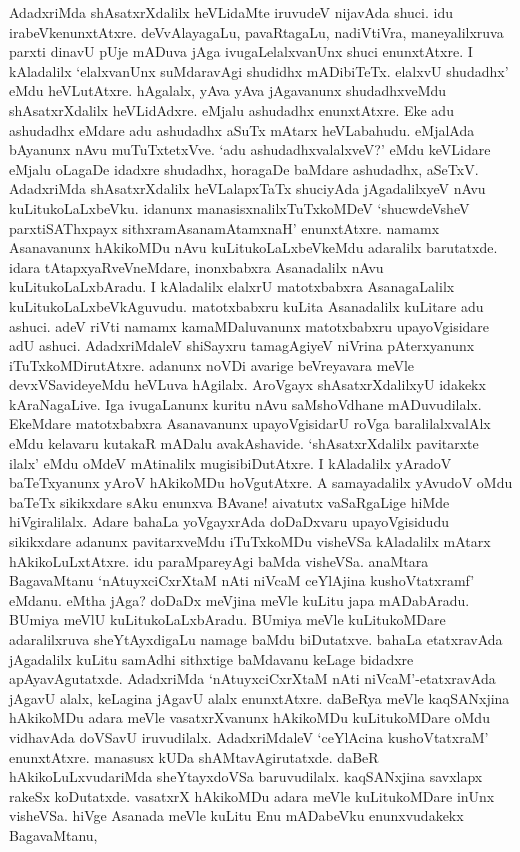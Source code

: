 AdadxriMda shAsatxrXdalilx heVLidaMte iruvudeV nijavAda shuci. idu irabeVkenunxtAtxre. deVvAlayagaLu, pavaRtagaLu, nadiVtiVra, maneyalilxruva parxti dinavU pUje mADuva jAga ivugaLelalxvanUnx shuci enunxtAtxre. I kAladalilx `elalxvanUnx suMdaravAgi shudidhx mADibiTeTx. elalxvU shudadhx' eMdu heVLutAtxre. hAgalalx, yAva yAva jAgavanunx shudadhxveMdu shAsatxrXdalilx heVLidAdxre. eMjalu ashudadhx enunxtAtxre. Eke adu ashudadhx eMdare adu ashudadhx aSuTx mAtarx heVLabahudu. eMjalAda bAyanunx nAvu muTuTxtetxVve. `adu ashudadhxvalalxveV?' eMdu keVLidare eMjalu oLagaDe idadxre shudadhx, horagaDe baMdare ashudadhx, aSeTxV. AdadxriMda shAsatxrXdalilx heVLalapxTaTx shuciyAda jAgadalilxyeV nAvu kuLitukoLaLxbeVku. idanunx manasisxnalilxTuTxkoMDeV `shucwdeVsheV parxtiSAThxpayx sithxramAsanamAtamxnaH' enunxtAtxre. namamx Asanavanunx hAkikoMDu nAvu kuLitukoLaLxbeVkeMdu adaralilx barutatxde. idara tAtapxyaRveVneMdare, inonxbabxra Asanadalilx nAvu kuLitukoLaLxbAradu. I kAladalilx elalxrU matotxbabxra AsanagaLalilx kuLitukoLaLxbeVkAguvudu. matotxbabxru kuLita Asanadalilx kuLitare adu ashuci. adeV riVti namamx kamaMDaluvanunx matotxbabxru upayoVgisidare adU ashuci. AdadxriMdaleV shiSayxru tamagAgiyeV niVrina pAterxyanunx iTuTxkoMDirutAtxre. adanunx noVDi avarige beVreyavara meVle devxVSavideyeMdu heVLuva hAgilalx. AroVgayx shAsatxrXdalilxyU idakekx kAraNagaLive. Iga ivugaLanunx kuritu nAvu saMshoVdhane mADuvudilalx. EkeMdare matotxbabxra Asanavanunx upayoVgisidarU roVga baralilalxvalAlx eMdu kelavaru kutakaR mADalu avakAshavide. `shAsatxrXdalilx pavitarxte ilalx' eMdu oMdeV mAtinalilx mugisibiDutAtxre. I kAladalilx yAradoV baTeTxyanunx yAroV hAkikoMDu hoVgutAtxre. A samayadalilx yAvudoV oMdu baTeTx sikikxdare sAku enunxva BAvane! aivatutx vaSaRgaLige hiMde hiVgiralilalx. Adare bahaLa yoVgayxrAda doDaDxvaru upayoVgisidudu sikikxdare adanunx pavitarxveMdu iTuTxkoMDu visheVSa kAladalilx mAtarx hAkikoLuLxtAtxre. idu paraMpareyAgi baMda visheVSa. anaMtara BagavaMtanu `nAtuyxciCxrXtaM nAti niVcaM ceYlAjina kushoVtatxramf' eMdanu. eMtha jAga? doDaDx meVjina meVle kuLitu japa mADabAradu. BUmiya meVlU kuLitukoLaLxbAradu. BUmiya meVle kuLitukoMDare adaralilxruva sheYtAyxdigaLu namage baMdu biDutatxve. bahaLa etatxravAda jAgadalilx kuLitu samAdhi sithxtige baMdavanu keLage bidadxre apAyavAgutatxde. AdadxriMda `nAtuyxciCxrXtaM nAti niVcaM'-etatxravAda jAgavU alalx, keLagina jAgavU alalx enunxtAtxre. daBeRya meVle kaqSANxjina hAkikoMDu adara meVle vasatxrXvanunx hAkikoMDu kuLitukoMDare oMdu vidhavAda doVSavU iruvudilalx. AdadxriMdaleV `ceYlAcina kushoVtatxraM' enunxtAtxre. manasusx kUDa shAMtavAgirutatxde. daBeR hAkikoLuLxvudariMda sheYtayxdoVSa baruvudilalx. kaqSANxjina savxlapx rakeSx koDutatxde. vasatxrX hAkikoMDu adara meVle kuLitukoMDare inUnx visheVSa. hiVge Asanada meVle kuLitu Enu mADabeVku enunxvudakekx BagavaMtanu,

